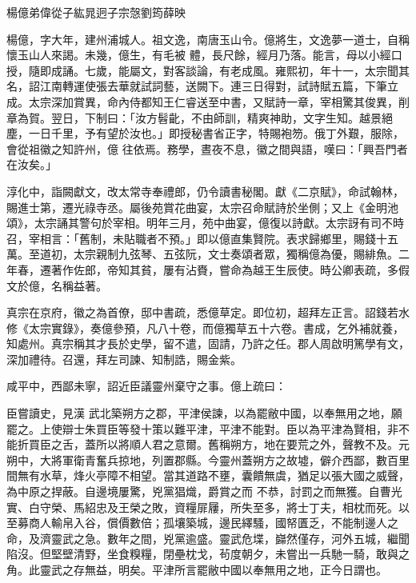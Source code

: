 
\begin{pinyinscope}

 楊億弟偉從子紘晁迥子宗愨劉筠薛映



 楊億，字大年，建州浦城人。祖文逸，南唐玉山令。億將生，文逸夢一道士，自稱懷玉山人來謁。未幾，億生，有毛被
 體，長尺餘，經月乃落。能言，母以小經口授，隨即成誦。七歲，能屬文，對客談論，有老成風。雍熙初，年十一，太宗聞其名，詔江南轉運使張去華就試詞藝，送闕下。連三日得對，試詩賦五篇，下筆立成。太宗深加賞異，命內侍都知王仁睿送至中書，又賦詩一章，宰相驚其俊異，削章為賀。翌日，下制曰：「汝方髫齔，不由師訓，精爽神助，文字生知。越景絕塵，一日千里，予有望於汝也。」即授秘書省正字，特賜袍笏。俄丁外艱，服除，會從祖徽之知許州，億
 往依焉。務學，晝夜不息，徽之間與語，嘆曰：「興吾門者在汝矣。」



 淳化中，詣闕獻文，改太常寺奉禮郎，仍令讀書秘閣。獻《二京賦》，命試翰林，賜進士第，遷光祿寺丞。屬後苑賞花曲宴，太宗召命賦詩於坐側；又上《金明池頌》，太宗誦其警句於宰相。明年三月，苑中曲宴，億復以詩獻。太宗訝有司不時召，宰相言：「舊制，未貼職者不預。」即以億直集賢院。表求歸鄉里，賜錢十五萬。至道初，太宗親制九弦琴、五弦阮，文士奏頌者眾，獨稱億為優，賜緋魚。二
 年春，遷著作佐郎，帝知其貧，屢有沾賚，嘗命為越王生辰使。時公卿表疏，多假文於億，名稱益著。



 真宗在京府，徽之為首僚，邸中書疏，悉億草定。即位初，超拜左正言。詔錢若水修《太宗實錄》，奏億參預，凡八十卷，而億獨草五十六卷。書成，乞外補就養，知處州。真宗稱其才長於史學，留不遣，固請，乃許之任。郡人周啟明篤學有文，深加禮待。召還，拜左司諫、知制誥，賜金紫。



 咸平中，西鄙未寧，詔近臣議靈州棄守之事。億上疏曰：



 臣嘗讀史，見漢
 武北築朔方之郡，平津侯諫，以為罷敝中國，以奉無用之地，願罷之。上使辯士朱買臣等發十策以難平津，平津不能對。臣以為平津為賢相，非不能折買臣之舌，蓋所以將順人君之意爾。舊稱朔方，地在要荒之外，聲教不及。元朔中，大將軍衛青奮兵掠地，列置郡縣。今靈州蓋朔方之故墟，僻介西鄙，數百里間無有水草，烽火亭障不相望。當其道路不壅，囊饋無虞，猶足以張大國之威聲，為中原之捍蔽。自邊境屢驚，兇黨猖熾，爵賞之而
 不恭，討罰之而無獲。自曹光實、白守榮、馬紹忠及王榮之敗，資糧屝屨，所失至多，將士丁夫，相枕而死。以至募商人輸帛入谷，償價數倍；孤壤築城，邊民繹騷，國帑匱乏，不能制邊人之命，及濟靈武之急。數年之間，兇黨逾盛。靈武危堞，巋然僅存，河外五城，繼聞陷沒。但堅壁清野，坐食糗糧，閉壘枕戈，茍度朝夕，未嘗出一兵馳一騎，敢與之角。此靈武之存無益，明矣。平津所言罷敝中國以奉無用之地，正今日謂也。




\end{pinyinscope}
